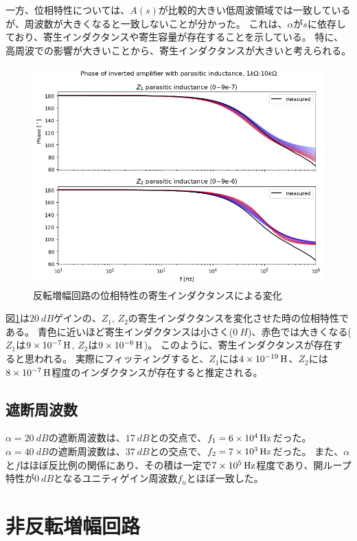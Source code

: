 \documentclass[a4paper]{ltjsarticle}
\begin{document}
一方、位相特性については、$A(s)$が比較的大きい低周波領域では一致しているが、周波数が大きくなると一致しないことが分かった。
これは、$\alpha$が$s$に依存しており、寄生インダクタンスや寄生容量が存在することを示している。
特に、高周波での影響が大きいことから、寄生インダクタンスが大きいと考えられる。
\begin{figure}[htbp]
    \centering
    \includegraphics[width=0.8\columnwidth]{./images/invertamp_bode_pi.png}
    \caption{反転増幅回路の位相特性の寄生インダクタンスによる変化}
    \label{fig:invertamp_bode_pi}
\end{figure}

図\ref{fig:invertamp_bode_pi}は$\SI{20}{dB}$ゲインの、$Z_1,\,Z_2$の寄生インダクタンスを変化させた時の位相特性である。
青色に近いほど寄生インダクタンスは小さく($\SI{0}{H}$)、赤色では大きくなる($Z_1$は$\SI{9E-7}{H}$, $Z_2$は$\SI{9E-6}{H}$)。
このように、寄生インダクタンスが存在すると思われる。
実際にフィッティングすると、$Z_1$には$\SI{4E-19}{H}$、$Z_2$には$\SI{8E-7}{H}$程度のインダクタンスが存在すると推定される。

\subsection{遮断周波数}
$\alpha=\SI{20}{dB}$の遮断周波数は、$\SI{17}{dB}$との交点で、$f_1=\SI{6E4}{Hz}$だった。
$\alpha=\SI{40}{dB}$の遮断周波数は、$\SI{37}{dB}$との交点で、$f_2=\SI{7E3}{Hz}$だった。
また、$\alpha$と$f$はほぼ反比例の関係にあり、その積は一定で$\SI{7E5}{Hz}$程度であり、開ループ特性が$\SI{0}{dB}$となるユニティゲイン周波数$f_u$とほぼ一致した。

\section{非反転増幅回路}
\end{document}
